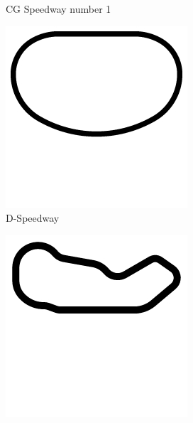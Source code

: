 \begin{figure}[t]
\begin{subfigure}[b]{0.15\textwidth}
       \caption{CG Speedway number 1}
   \end{subfigure}
\begin{subfigure}[b]{0.15\textwidth}
       \includegraphics[width=\textwidth]{img/tracks/D-Speedway}
       \caption{D-Speedway}
   \end{subfigure}
\begin{subfigure}[b]{0.15\textwidth}
       \includegraphics[width=\textwidth]{img/tracks/Dirt1}

\end{subfigure}
\end{figure}

